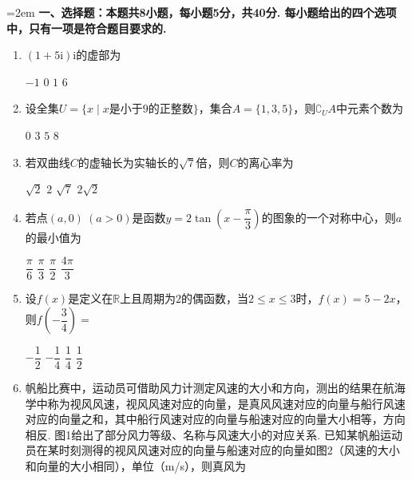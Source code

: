 \documentclass[12pt,a4paper]{article}
\begin{document}
	\noindent\hangindent=2em {\bfseries 一、选择题：本题共8小题，每小题5分，共40分. 每小题给出的四个选项中，只有一项是符合题目要求的.}
	\begin{enumerate}[leftmargin=*,label=\arabic*.,itemsep=0.8ex]
		\item $(1+5\mathrm{i})\mathrm{i}$的虚部为
		\begin{choicesFour}
			\choice $-1$ \choice $0$ \choice $1$ \choice $6$
		\end{choicesFour}
		\item 设全集$U=\{x\mid x\text{是小于}9\text{的正整数}\}$，集合$A=\{1,3,5\}$，则$\complement_U A$中元素个数为
		\begin{choicesFour}
			\choice $0$ \choice $3$ \choice $5$ \choice $8$
		\end{choicesFour}
		\item 若双曲线$C$的虚轴长为实轴长的$\sqrt7$倍，则$C$的离心率为
		\begin{choicesFour}
			\choice $\sqrt2$ \choice $2$ \choice $\sqrt7$ \choice $2\sqrt2$
		\end{choicesFour}
		\item 若点$(a,0)\ (a>0)$是函数$y=2\tan\left(x-\dfrac{\pi}{3}\right)$的图象的一个对称中心，则$a$的最小值为
		\begin{choicesFour}
			\choice $\dfrac{\pi}{6}$ \choice $\dfrac{\pi}{3}$ \choice $\dfrac{\pi}{2}$ \choice $\dfrac{4\pi}{3}$
		\end{choicesFour}
		\item 设$f(x)$是定义在$\mathbb{R}$上且周期为$2$的偶函数，当$2\le x\le3$时，$f(x)=5-2x$，则$f\left(-\dfrac34\right)=$
		\begin{choicesFour}
			\choice $-\dfrac12$ \choice $-\dfrac14$ \choice $\dfrac14$ \choice $\dfrac12$
		\end{choicesFour}
		\item 帆船比赛中，运动员可借助风力计测定风速的大小和方向，测出的结果在航海学中称为视风风速，视风风速对应的向量，是真风风速对应的向量与船行风速对应的向量之和，其中船行风速对应的向量与船速对应的向量大小相等，方向相反. 图1给出了部分风力等级、名称与风速大小的对应关系. 已知某帆船运动员在某时刻测得的视风风速对应的向量与船速对应的向量如图2（风速的大小和向量的大小相同），单位（m/s），则真风为
		

\end{enumerate}
\end{document}
